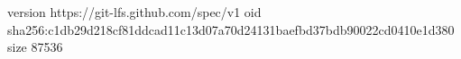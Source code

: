 version https://git-lfs.github.com/spec/v1
oid sha256:c1db29d218cf81ddcad11c13d07a70d24131baefbd37bdb90022cd0410e1d380
size 87536
